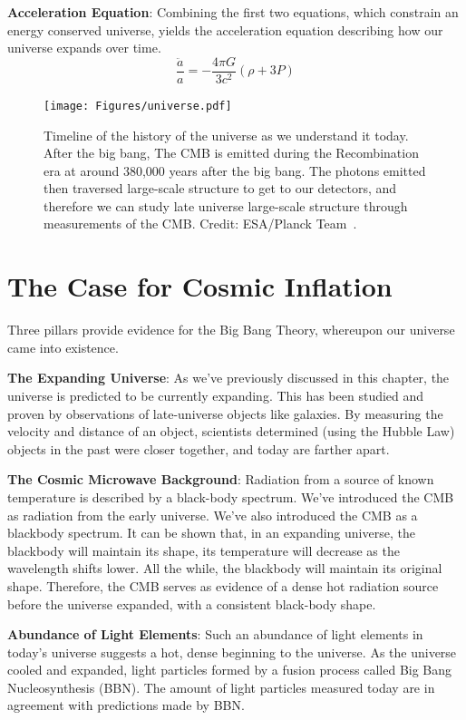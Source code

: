 \noindent
\textbf{Acceleration Equation}: Combining the first two equations, which constrain an energy conserved universe, yields the acceleration equation describing how our universe expands over time.  
\begin{equation}
    \frac{\ddot{a}}{a} = - \frac{4\pi G}{3 c^2} (\rho + 3 P)
\end{equation}

\begin{figure}
    \centering
    \texttt{[image: Figures/universe.pdf]}
    \caption{Timeline of the history of the universe as we understand it today.  After the big bang, The CMB is emitted during the Recombination era at around 380,000 years after the big bang.  The photons emitted then traversed large-scale structure to get to our detectors, and therefore we can study late universe large-scale structure through measurements of the CMB.  Credit: ESA/Planck Team~\cite{NASApic}.}
    \label{fig:universe_timeline}
\end{figure}
\section{The Case for Cosmic Inflation}
Three pillars provide evidence for the Big Bang Theory, whereupon our universe came into existence.

\noindent
\textbf{The Expanding Universe}: As we've previously discussed in this chapter, the universe is predicted to be currently expanding.  This has been studied and proven by observations of late-universe objects like galaxies.  By measuring the velocity and distance of an object, scientists determined (using the Hubble Law) objects in the past were closer together, and today are farther apart.  

\noindent
\textbf{The Cosmic Microwave Background}:
Radiation from a source of known temperature is described by a black-body spectrum.  We've introduced the CMB as radiation from the early universe.  We've also introduced the CMB as a blackbody spectrum.  It can be shown that, in an expanding universe, the blackbody will maintain its shape, its temperature will decrease as the wavelength shifts lower.  All the while, the blackbody will maintain its original shape.  Therefore, the CMB serves as evidence of a dense hot radiation source before the universe expanded, with a consistent black-body shape.

\noindent
\textbf{Abundance of Light Elements}:  Such an abundance of light elements in today's universe suggests a hot, dense beginning to the universe.  As the universe cooled and expanded, light particles formed by a fusion process called Big Bang Nucleosynthesis (BBN).  The amount of light particles measured today are in agreement with predictions made by BBN.


